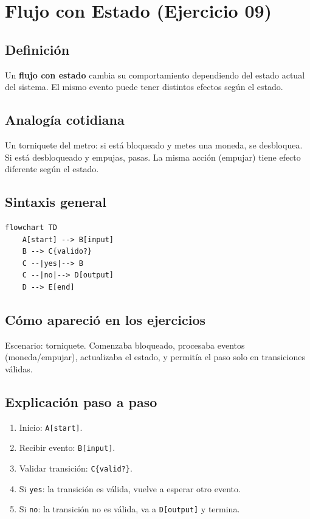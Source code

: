 \documentclass[12pt]{article}
\begin{document}
\newpage

\section{Flujo con Estado (Ejercicio 09)}

\subsection{Definición}

Un \textbf{flujo con estado} cambia su comportamiento dependiendo del estado actual del sistema. El mismo evento puede tener distintos efectos según el estado.

\subsection{Analogía cotidiana}

Un torniquete del metro: si está bloqueado y metes una moneda, se desbloquea. Si está desbloqueado y empujas, pasas. La misma acción (empujar) tiene efecto diferente según el estado.

\subsection{Sintaxis general}

\begin{lstlisting}[style=mermaidstyle]
flowchart TD
    A[start] --> B[input]
    B --> C{valido?}
    C --|yes|--> B
    C --|no|--> D[output]
    D --> E[end]
\end{lstlisting}

\subsection{Cómo apareció en los ejercicios}

Escenario: torniquete. Comenzaba bloqueado, procesaba eventos (moneda/empujar), actualizaba el estado, y permitía el paso solo en transiciones válidas.

\subsection{Explicación paso a paso}

\begin{enumerate}
    \item Inicio: \texttt{A[start]}.
    \item Recibir evento: \texttt{B[input]}.
    \item Validar transición: \texttt{C\{valid?\}}.
    \item Si \texttt{yes}: la transición es válida, vuelve a esperar otro evento.
    \item Si \texttt{no}: la transición no es válida, va a \texttt{D[output]} y termina.
\end{enumerate}
\end{document}
